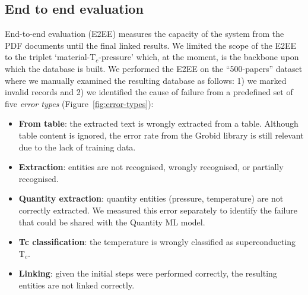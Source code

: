 \documentclass[]{interact}
\theoremstyle{plain}%
\theoremstyle{definition}
\theoremstyle{remark}
\newcommand{\tc}{T$_{c}$}
\begin{document}


\subsection{End to end evaluation}

End-to-end evaluation (E2EE) measures the capacity of the system from the PDF documents until the final linked results.
We limited the scope of the E2EE to the triplet `material-\tc-pressure' which, at the moment, is the backbone upon which the database is built.
We performed the E2EE on the ``500-papers'' dataset where we manually examined the resulting database as follows: 1) we marked invalid records and 2) we identified the cause of failure from a predefined set of five \textit{error types} (Figure~\ref{fig:error-types}):
\begin{itemize}
    \item \textbf{From table}: the extracted text is wrongly extracted from a table. Although table content is ignored, the error rate from the Grobid library is still relevant due to the lack of training data.
    \item \textbf{Extraction}: entities are not recognised, wrongly recognised, or partially recognised.
    \item \textbf{Quantity extraction}: quantity entities (pressure, temperature) are not correctly extracted. We measured this error separately to identify the failure that could be shared with the Quantity ML model.
    \item \textbf{Tc classification}: the temperature is wrongly classified as superconducting \tc.
    \item \textbf{Linking}: given the initial steps were performed correctly, the resulting entities are not linked correctly.
\end{itemize}
\end{document}
